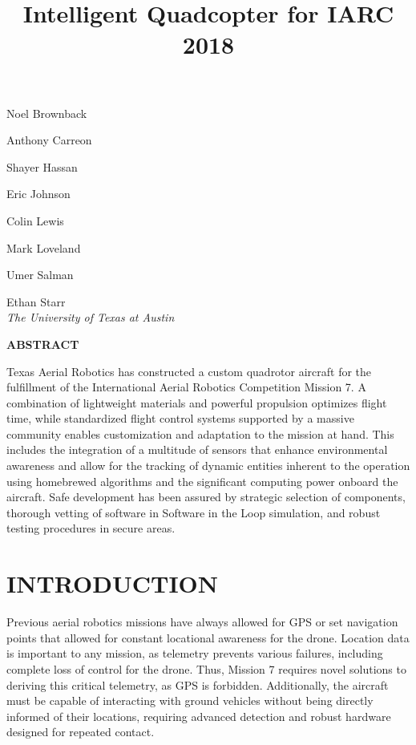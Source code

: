 \documentclass[12pt,letterpaper]{article}
\title{Intelligent Quadcopter for IARC 2018}
\newenvironment{nscenter}
 {\parskip=0pt\par\nopagebreak\centering}
 {\par\noindent\ignorespacesafterend}
\newcommand{\affiliatedauthor}[2]{
\begin{nscenter}
	#1 \\ \textit{#2}
\end{nscenter}
}
\renewcommand{\abstractname}{ABSTRACT}
\renewenvironment{abstract}
 {\vspace{-0.5ex}
	\small
	\begin{center}
		\bfseries \abstractname\vspace{-4ex}\vspace{0pt}
	\end{center}
	\list{}{
		\setlength{\leftmargin}{0.5in}
		\setlength{\rightmargin}{\leftmargin}
	}
	\item\relax}
 {\endlist}
\begin{document}
\begin{center}
	\textbf{\LARGE{\thetitle}}
\end{center}

\affiliatedauthor{Noel Brownback}{\vspace{-.5cm}}
\affiliatedauthor{Anthony Carreon}{\vspace{-.5cm}}
\affiliatedauthor{Shayer Hassan}{\vspace{-.5cm}}
\affiliatedauthor{Eric Johnson}{\vspace{-.5cm}}
\affiliatedauthor{Colin Lewis}{\vspace{-.5cm}}
\affiliatedauthor{Mark Loveland}{\vspace{-.5cm}}
\affiliatedauthor{Umer Salman}{\vspace{-.5cm}}
\affiliatedauthor{Ethan Starr}{The University of Texas at Austin}


\begin{abstract}
	Texas Aerial Robotics has constructed a custom quadrotor aircraft for the fulfillment of the International Aerial Robotics Competition Mission 7. A combination of lightweight materials and powerful propulsion optimizes flight time, while standardized flight control systems supported by a massive community enables customization and adaptation to the mission at hand. This includes the integration of a multitude of sensors that enhance environmental awareness and allow for the tracking of dynamic entities inherent to the operation using homebrewed algorithms and the significant computing power onboard the aircraft. Safe development has been assured by strategic selection of components, thorough vetting of software in Software in the Loop simulation, and robust testing procedures in secure areas.
\end{abstract}


\section*{INTRODUCTION}
	Previous aerial robotics missions have always allowed for GPS or set navigation points that allowed for constant locational awareness for the drone. Location data is important to any mission, as telemetry prevents various failures, including complete loss of control for the drone. Thus, Mission 7 requires novel solutions to deriving this critical telemetry, as GPS is forbidden. Additionally, the aircraft must be capable of interacting with ground vehicles without being directly informed of their locations, requiring advanced detection and robust hardware designed for repeated contact.
\end{document}
